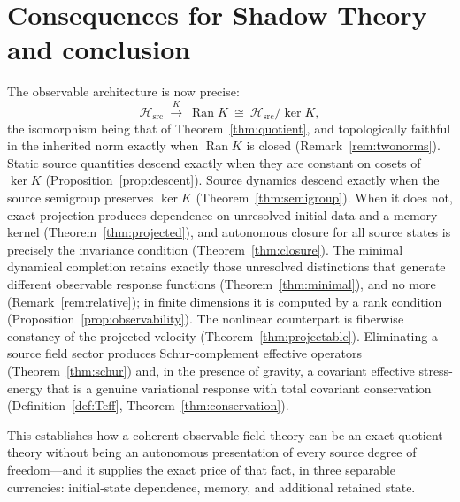 \documentclass[11pt,reqno]{amsart}
\numberwithin{equation}{section}
\theoremstyle{plain}
\theoremstyle{definition}
\theoremstyle{remark}
\newcommand{\Hsrc}{\mathcal{H}_{\mathrm{src}}}
\newcommand{\Ran}{\operatorname{Ran}}
\begin{document}
\section{Consequences for Shadow Theory and conclusion}
\label{sec:conclusion}

The observable architecture is now precise:
\begin{equation}
\label{eq:arch}
\Hsrc\ \xrightarrow{\ K\ }\ \Ran K\ \cong\ \Hsrc/\ker K ,
\end{equation}
the isomorphism being that of Theorem~\ref{thm:quotient}, and topologically faithful in the
inherited norm exactly when $\Ran K$ is closed (Remark~\ref{rem:twonorms}). Static source
quantities descend exactly when they are constant on cosets of $\ker K$
(Proposition~\ref{prop:descent}). Source dynamics descend exactly when the source semigroup
preserves $\ker K$ (Theorem~\ref{thm:semigroup}). When it does not, exact projection produces
dependence on unresolved initial data and a memory kernel (Theorem~\ref{thm:projected}), and
autonomous closure for all source states is precisely the invariance condition
(Theorem~\ref{thm:closure}). The minimal dynamical completion retains exactly those unresolved
distinctions that generate different observable response functions
(Theorem~\ref{thm:minimal}), and no more (Remark~\ref{rem:relative}); in finite dimensions it
is computed by a rank condition (Proposition~\ref{prop:observability}). The nonlinear
counterpart is fiberwise constancy of the projected velocity
(Theorem~\ref{thm:projectable}). Eliminating a source field sector produces Schur-complement
effective operators (Theorem~\ref{thm:schur}) and, in the presence of gravity, a covariant
effective stress-energy that is a genuine variational response with total covariant
conservation (Definition~\ref{def:Teff}, Theorem~\ref{thm:conservation}).

This establishes how a coherent observable field theory can be an exact quotient theory
without being an autonomous presentation of every source degree of freedom---and it supplies
the exact price of that fact, in three separable currencies: initial-state dependence, memory,
and additional retained state.
\end{document}
